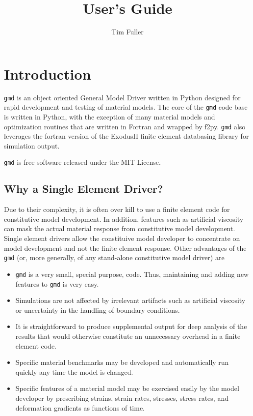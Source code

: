 \documentclass[11pt]{report}
\title{\gmd{} User's Guide}
\author{Tim Fuller}
\newcommand{\gmd}{\texttt{gmd}}
\begin{document}
\maketitle

\chapter{Introduction}
\gmd{} is an object oriented General Model Driver written in Python designed
for rapid development and testing of material models. The core of the \gmd{}
code base is written in Python, with the exception of many material models and
optimization routines that are written in Fortran and wrapped by f2py. \gmd{}
also leverages the fortran version of the ExodusII finite element databasing
library for simulation output.

\gmd{} is free software released under the MIT License.


\section{Why a Single Element Driver?}
Due to their complexity, it is often over kill to use a finite element code
for constitutive model development. In addition, features such as artificial
viscosity can mask the actual material response from constitutive model
development. Single element drivers allow the constituive model developer to
concentrate on model development and not the finite element response. Other
advantages of the \gmd{} (or, more generally, of any stand-alone
constitutive model driver) are

\begin{itemize}
  \item \gmd{} is a very small, special purpose, code. Thus, maintaining and
  adding new features to \gmd{} is very easy.

  \item Simulations are not affected by irrelevant artifacts such as
  artificial viscosity or uncertainty in the handling of boundary conditions.

  \item It is straightforward to produce supplemental output for deep analysis
  of the results that would otherwise constitute an unnecessary overhead in a
  finite element code.

  \item Specific material benchmarks may be developed and automatically run
  quickly any time the model is changed.

  \item Specific features of a material model may be exercised easily by the
  model developer by prescribing strains, strain rates, stresses, stress
  rates, and deformation gradients as functions of time.
\end{itemize}
\end{document}
